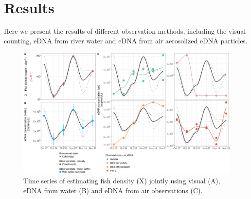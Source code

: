 \documentclass{article}
\begin{document}
\clearpage
\section{Results}

Here we present the results of different observation methods, including the visual counting, eDNA from river water and eDNA from air aerosolized eDNA particles.


\begin{figure}[tbhp] 
\centering
\includegraphics[width=16.5cm]{Plots/Figure_1.jpg}  
\caption{Time series of estimating fish density (X) jointly using visual (A), eDNA from water (B) and eDNA from air observations (C).}
\label{fig:fig1}
\end{figure}
\end{document}
